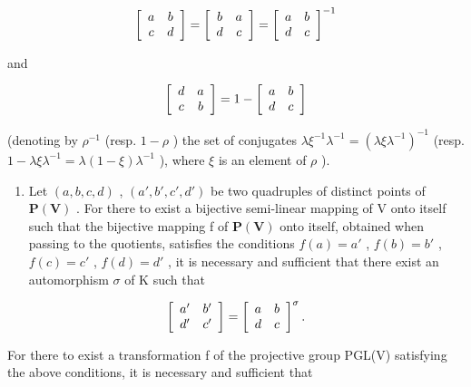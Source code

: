 \[
\left[ \begin{array}{c c} a & b \\ c & d \end{array} \right] = \left[ \begin{array}{c c} b & a \\ d & c \end{array} \right] = \left[ \begin{array}{c c} a & b \\ d & c \end{array} \right] ^ {- 1}
\]

and

\[
\left[ \begin{array}{c c} d & a \\ c & b \end{array} \right] = 1 - \left[ \begin{array}{c c} a & b \\ d & c \end{array} \right]
\]

(denoting by \(\rho^{-1}\) (resp. \(1 - \rho\) ) the set of conjugates \(\lambda \xi^{-1} \lambda^{-1} = (\lambda \xi \lambda^{-1})^{-1}\) (resp. \(1 - \lambda \xi \lambda^{-1} = \lambda (1 - \xi) \lambda^{-1}\) ), where \(\xi\) is an element of \(\rho\) ).

\begin{enumerate}
\def\labelenumi{(\alph{enumi})}
\setcounter{enumi}{2}
\tightlist
\item
  Let \((a, b, c, d)\) , \((a', b', c', d')\) be two quadruples of distinct points of \(\mathbf{P}(\mathbf{V})\) . For there to exist a bijective semi-linear mapping of V onto itself such that the bijective mapping f of \(\mathbf{P}(\mathbf{V})\) onto itself, obtained when passing to the quotients, satisfies the conditions \(f(a) = a'\) , \(f(b) = b'\) , \(f(c) = c'\) , \(f(d) = d'\) , it is necessary and sufficient that there exist an automorphism \(\sigma\) of K such that
\end{enumerate}

\[
\left[ \begin{array}{c c} a ^ {\prime} & b ^ {\prime} \\ d ^ {\prime} & c ^ {\prime} \end{array} \right] = \left[ \begin{array}{c c} a & b \\ d & c \end{array} \right] ^ {\sigma}.
\]

For there to exist a transformation f of the projective group PGL(V) satisfying the above conditions, it is necessary and sufficient that

